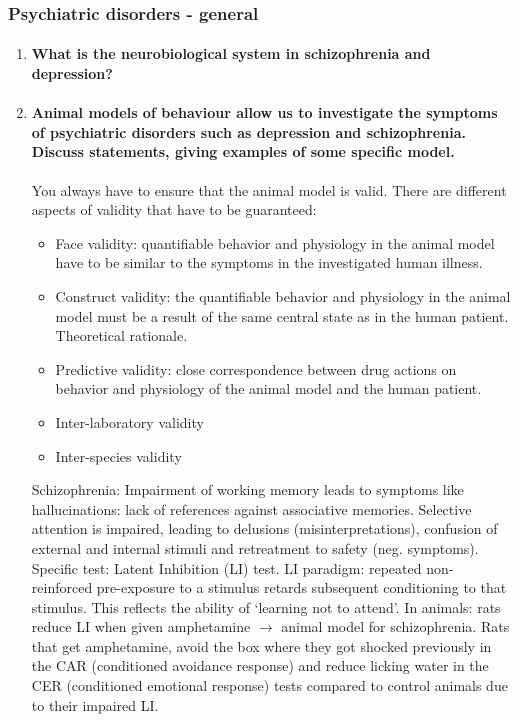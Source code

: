 \documentclass[12pt,article,oneside,a4paper]{memoir}
\begin{document}
\subsubsection{Psychiatric disorders - general}
\begin{enumerate}
\item \paragraph{What is the neurobiological system in schizophrenia and depression?}

\item \paragraph{Animal models of behaviour allow us to investigate the symptoms of psychiatric disorders such as depression and schizophrenia. Discuss statements, giving examples of some specific model.}

You always have to ensure that the animal model is valid. There are different aspects of validity that have to be guaranteed:
\begin{itemize}
\item Face validity: quantifiable behavior and physiology in the animal model have to be similar to the symptoms in the investigated human illness.
\item Construct validity: the quantifiable behavior and physiology in the animal model must be a result of the same central state as in the human patient. Theoretical rationale.
\item Predictive validity: close correspondence between drug actions on behavior and physiology of the animal model and the human patient.
\item Inter-laboratory validity
\item Inter-species validity
\end{itemize}

Schizophrenia:
Impairment of working memory leads to symptoms like hallucinations: lack of references against associative memories.
Selective attention is impaired, leading to delusions (misinterpretations), confusion of external and internal stimuli and retreatment to safety (neg. symptoms).
Specific test: Latent Inhibition (LI) test. LI paradigm: repeated non-reinforced pre-exposure to a stimulus retards subsequent conditioning to that stimulus. This reflects the ability of ‘learning not to attend’. In animals: rats reduce LI when given amphetamine $\rightarrow$ animal model for schizophrenia. Rats that get amphetamine, avoid the box where they got shocked previously in the CAR (conditioned avoidance response) and reduce licking water in the CER (conditioned emotional response) tests compared to control animals due to their impaired LI. 


\end{enumerate}
\end{document}
